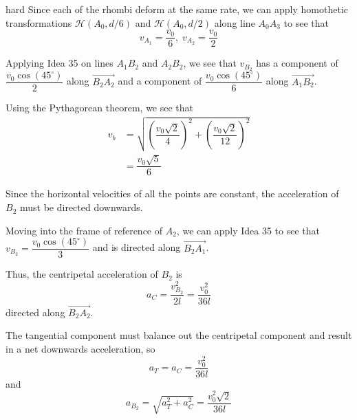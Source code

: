 \begin{solution}{hard}
Since each of the rhombi deform at the same rate, we can apply homothetic transformations $\mathcal{H}(A_0,d/6)$ and $\mathcal{H}(A_0,d/2)$ along line $A_0A_3$ to see that
$$\boxed{v_{A_1}=\dfrac{v_0}{6},\;v_{A_2}=\dfrac{v_0}{2}}$$

Applying Idea 35 on lines $A_1B_2$ and $A_2B_2$, we see that $v_{B_2}$ has a component of $\dfrac{v_0\cos(45^\circ)}{2}$ along $\overrightarrow{B_2A_2}$ and a component of $\dfrac{v_0\cos(45^\circ)}{6}$ along $\overrightarrow{A_1B_2}$.\vspace{3mm}

Using the Pythagorean theorem, we see that
\begin{align*}
v_b&=\sqrt{\left(\dfrac{v_0\sqrt{2}}{4}\right)^2+\left(\dfrac{v_0\sqrt{2}}{12}\right)^2}\\
&=\boxed{\dfrac{v_0\sqrt{5}}{6}}
\end{align*}

Since the horizontal velocities of all the points are constant, the acceleration of $B_2$ must be directed downwards.\vspace{3mm}

Moving into the frame of reference of $A_2$, we can apply Idea 35 to see that $v_{B_2}=\dfrac{v_0\cos(45^\circ)}{3}$ and is directed along $\overrightarrow{B_2A_1}$.\vspace{3mm}

Thus, the centripetal acceleration of $B_2$ is
$$a_C=\dfrac{v_{B_2}^2}{2l}=\dfrac{v_0^2}{36l}$$
directed along $\overrightarrow{B_2A_2}$.\vspace{3mm}

The tangential component must balance out the centripetal component and result in a net downwards acceleration, so
$$a_T=a_C=\dfrac{v_0^2}{36l}$$
and
$$a_{B_2}=\sqrt{a_T^2+a_C^2}=\boxed{\dfrac{v_0^2\sqrt{2}}{36l}}$$
\end{solution}
